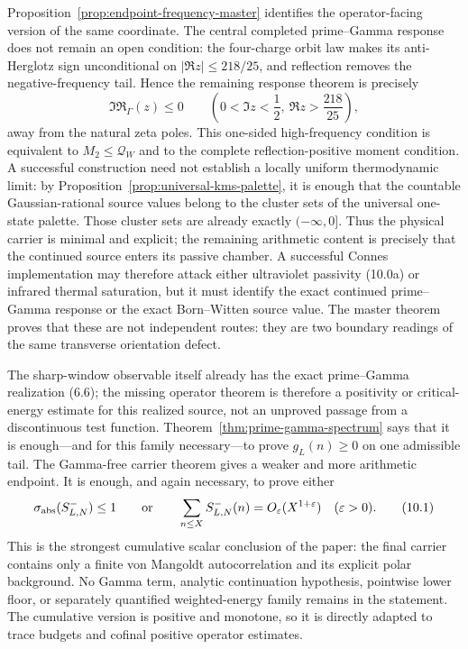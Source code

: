 \documentclass[11pt]{article}
\begin{document}
Proposition~\ref{prop:endpoint-frequency-master} identifies the operator-facing version of the
same coordinate.  The central completed prime--Gamma response does not remain an open condition:
the four-charge orbit law makes its anti-Herglotz sign unconditional on
$|\Re z|\le218/25$, and reflection removes the
negative-frequency tail.  Hence the remaining response theorem is precisely
\[
 \Im\mathfrak R_\Gamma(z)\le0
 \qquad\left(0<\Im z<\frac12,\ \Re z>\frac{218}{25}\right),
 \tag{10.0a}
\]
away from the natural zeta poles.  This one-sided high-frequency condition is equivalent to
$M_2\le\mathcal Q_W$ and to the complete reflection-positive moment condition.  A successful
construction need not establish a locally uniform thermodynamic limit: by
Proposition~\ref{prop:universal-kms-palette}, it is enough that the countable Gaussian-rational
source values belong to the cluster sets of the universal one-state palette.  Those cluster sets
are already exactly $(-\infty,0]$.  Thus the physical carrier is minimal and explicit; the
remaining arithmetic content is precisely that the continued source enters its passive chamber.
A successful Connes implementation may therefore attack either ultraviolet passivity
\textup{(10.0a)} or
infrared thermal saturation, but it must identify the exact continued prime--Gamma response or
the exact Born--Witten source value.  The master theorem proves that these are not independent
routes: they are two boundary readings of the same transverse orientation defect.

The sharp-window observable itself already has the exact prime--Gamma realization
\textup{(6.6)}; the missing operator theorem is therefore a positivity or critical-energy
estimate for this realized source, not an unproved passage from a discontinuous test function.
Theorem~\ref{thm:prime-gamma-spectrum} says that it is enough---and for this family
necessary---to prove $g_L(n)\ge0$ on one admissible tail.  The Gamma-free carrier theorem gives
a weaker and more arithmetic endpoint.  It is enough, and again necessary, to prove either
\[
 \sigma_{\rm abs}(S_{L,N}^-)\le1
 \qquad\text{or}\qquad
 \sum_{n\le X}S_{L,N}^-(n)=O_\varepsilon(X^{1+\varepsilon})
 \quad(\varepsilon>0).
 \tag{10.1}
\]
This is the strongest cumulative scalar conclusion of the paper: the final carrier contains only a finite
von Mangoldt autocorrelation and its explicit polar background.  No Gamma term, analytic
continuation hypothesis, pointwise lower floor, or separately quantified weighted-energy family
remains in the statement.  The cumulative version is positive and monotone, so it is directly
adapted to trace budgets and cofinal positive operator estimates.
\end{document}

